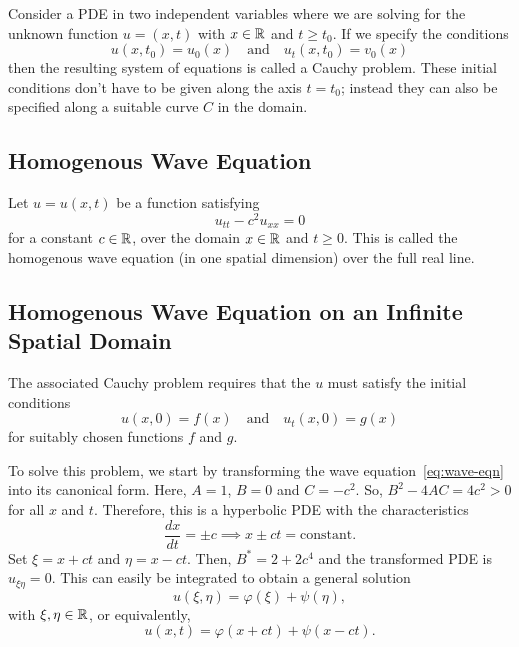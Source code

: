 \documentclass[11pt]{penrose}
\begin{document}
Consider a PDE in two independent variables where we are solving for the unknown function $u = (x,t)$ with $x \in \mathbb{R}$ and $t \geq t_0$. If we specify the conditions
\begin{equation}
    u(x, t_0) = u_0 (x)
    \quad\text{and}\quad
    u_t (x, t_0) = v_0 (x)
\end{equation}
then the resulting system of equations is called a Cauchy problem. These initial conditions don't have to be given along the axis $t = t_0$; instead they can also be specified along a suitable curve $C$ in the domain.

\subsection{Homogenous Wave Equation}
Let $u = u(x,t)$ be a function satisfying
\begin{equation}
    u_{tt} - c^2 u_{xx} = 0
    \label{eq:wave-eqn}
\end{equation}
for a constant $c \in \mathbb{R}$, over the domain $x \in \mathbb{R}$ and $t \geq 0$. This is called the homogenous wave equation (in one spatial dimension) over the full real line.

\subsection{Homogenous Wave Equation on an Infinite Spatial Domain}
The associated Cauchy problem requires that the $u$ must satisfy the initial conditions
\begin{equation}
    u(x, 0) = f(x)
    \quad\text{and}\quad
    u_t (x, 0) = g(x)
    \label{eq:wave-initial-infinite}
\end{equation}
for suitably chosen functions $f$ and $g$.

To solve this problem, we start by transforming the wave equation~\eqref{eq:wave-eqn} into its canonical form. Here, $A = 1$, $B = 0$ and $C = -c^2$. So, $B^2 - 4AC = 4c^2 > 0$ for all $x$ and $t$. Therefore, this is a hyperbolic PDE with the characteristics
\begin{equation}
    \frac{dx}{dt} = \pm c
    \implies
    x \pm ct = \text{constant}.
\end{equation}
Set $\xi = x + ct$ and $\eta = x - ct$. Then, $B^{*} = 2 + 2c^4$ and the transformed PDE is $u_{\xi\eta} = 0$. This can easily be integrated to obtain a general solution
\begin{equation}
    u(\xi, \eta) = \varphi(\xi) + \psi(\eta),
\end{equation}
with $\xi, \eta \in \mathbb{R}$, or equivalently,
\begin{equation}
    u(x, t) = \varphi(x + ct) + \psi(x - ct).
    \label{eq:wave-gen-soln}
\end{equation}
\end{document}

